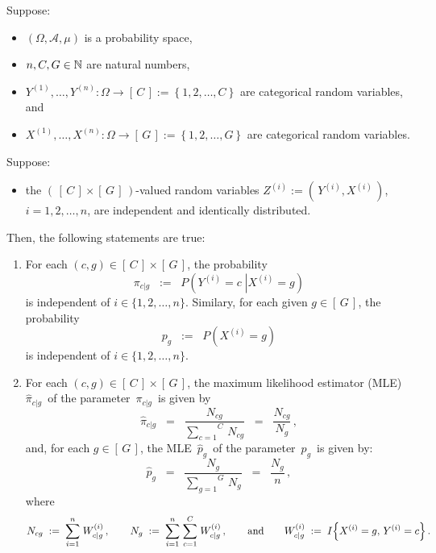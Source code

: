 \begin{proposition}
\mbox{}\vskip 0.1cm\noindent
Suppose:
\begin{itemize}
\item
	$\left(\Omega,\mathcal{A},\mu\right)$ is a probability space,
\item
	$n, C, G \in \mathbb{N}$ are natural numbers,
\item
	$Y^{(1)}, \ldots, Y^{(n)} : \Omega \longrightarrow \left[\,C\,\right] := \left\{1,2,\ldots,C\right\}$
	are categorical random variables, and
\item
	$X^{(1)}, \ldots, X^{(n)} : \Omega \longrightarrow \left[\,G\,\right] := \left\{1,2,\ldots,G\right\}$
	are categorical random variables.
\end{itemize}
Suppose:
\begin{itemize}
\item
	the $\left(\,\left[\,C\,\right] \times \left[\,G\,\right]\,\right)$-valued random variables
	$Z^{(i)} := \left(\,Y^{(i)},X^{(i)}\,\right)$, $i = 1, 2, \ldots, n$,
	are independent and identically distributed.
\end{itemize}
Then, the following statements are true:
\begin{enumerate}
\item
	\label{independenceOfI}
	For each $(c,g) \in \left[\,C\,\right] \times \left[\,G\,\right]$, the probability
	\begin{equation*}
	\pi_{c \vert g} \;\;:=\;\; P\!\left(\left.Y^{(i)} = c \;\right\vert X^{(i)} = g\right)
	\end{equation*}
	is independent of $i \in \{1,2,\ldots,n\}$.
	Similary, for each given $g \in \left[\,G\,\right]$, the probability
	\begin{equation*}
	p_{g} \;\; := \;\; P\!\left(X^{(i)} = g\right)
	\end{equation*}
	is independent of $i \in \{1,2,\ldots,n\}$.
\item
	For each $(c,g) \in \left[\,C\,\right] \times \left[\,G\,\right]$,
	the maximum likelihood estimator (MLE)
	\,$\widehat{\pi}_{c\vert g}$\,
	of the parameter
	\,$\pi_{c\vert g}$\,
	is given by
	\begin{equation*}
	\widehat{\pi}_{c\vert g}
	\;\; = \;\;
		\dfrac{N_{cg}}{\overset{C}{\underset{c=1}{\sum}}\,N_{cg}}
	\;\; = \;\;
		\dfrac{N_{cg}}{N_{g}}\,,
	\end{equation*}	
	and, for each $g \in \left[\,G\,\right]$,
	the MLE
	\,$\widehat{p}_{g}$\,
	of the parameter
	\,$p_{g}$\,
	is given by:
	\begin{equation*}
	\widehat{p}_{g}
	\;\; = \;\;
		\dfrac{N_{g}}{\overset{G}{\underset{g=1}{\sum}}\,N_{g}}
	\;\; = \;\;
		\dfrac{N_{g}}{n}\,,
	\end{equation*}
	where
	\begin{equation*}
	N_{cg}
		\; := \;
		\overset{n}{\underset{i=1}{\sum}}\;
		W^{(i)}_{c \vert g}\,,
	\quad\quad
	N_{g}
		\; := \;
		\overset{n}{\underset{i=1}{\sum}} \;
		\overset{C}{\underset{c=1}{\sum}} \;
		W^{(i)}_{c \vert g}\,,
	\quad\quad
	\textnormal{and}
	\quad\quad
	W^{(i)}_{c \vert g}
		\; := \;
		I\!\left\{X^{(i)}=g,\,Y^{(i)}=c\right\}.
	\end{equation*}
\end{enumerate}
\end{proposition}

